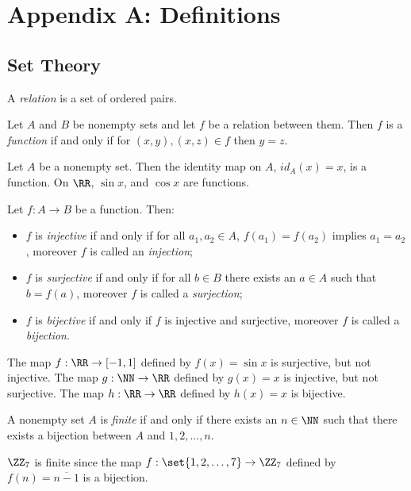 
\chapter*{Appendix A: Definitions}

\section*{Set Theory}

\begin{definition*}
	A \textit{relation} is a set of ordered pairs.
\end{definition*}

\begin{definition*}
	Let $A$ and $B$ be nonempty sets and let $f$ be a relation between them.
	Then $f$ is a \textit{function} if and only if for $(x,y),(x,z)\in f$ then $y=z$.
\end{definition*}
\begin{example*}
	Let $A$ be a nonempty set.
	Then the identity map on $A$, $id_A(x)=x$, is a function.
	On $\RR$, $\sin x$, and $\cos x$ are functions.
\end{example*}

\begin{definition*}
	Let $f:A\rightarrow B$ be a function.
	Then:
	\begin{itemize}
		\item $f$ is \textit{injective} if and only if for all $a_1,a_2\in A$, $f(a_1)=f(a_2)$ implies $a_1=a_2$, moreover $f$ is called an \textit{injection};
		\item $f$ is \textit{surjective} if and only if for all $b\in B$ there exists an $a\in A$ such that $b=f(a)$, moreover $f$ is called a \textit{surjection};
		\item $f$ is \textit{bijective} if and only if $f$ is injective and surjective, moreover $f$ is called a \textit{bijection}.
	\end{itemize}
\end{definition*}
\begin{example*}
	The map $f:\RR\rightarrow[-1,1]$ defined by $f(x)=\sin x$ is surjective, but not injective.
	The map $g:\NN\rightarrow\RR$ defined by $g(x)=x$ is injective, but not surjective.
	The map $h:\RR\rightarrow\RR$ defined by $h(x)=x$ is bijective.
\end{example*}

\begin{definition*}
	A nonempty set $A$ is \textit{finite} if and only if there exists an $n\in\NN$ such that there exists a bijection between $A$ and ${1,2,\ldots, n}$.
\end{definition*}
\begin{example*}
	$\ZZ_7$ is finite since the map $f:\set{1,2,\ldots, 7}\rightarrow \ZZ_7$ defined by $f(n)=\overline{n-1}$ is a bijection.
\end{example*}

